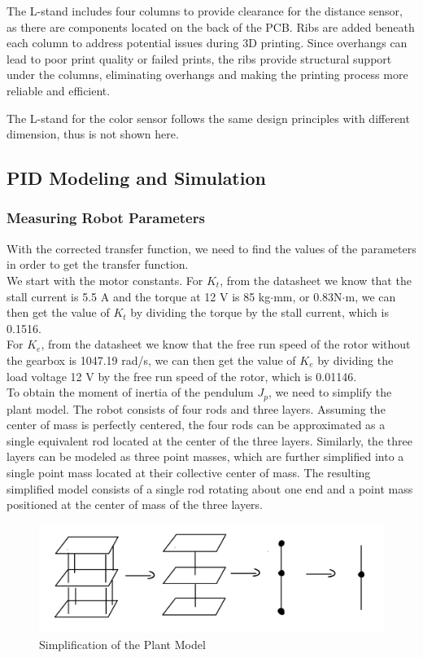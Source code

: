 \documentclass{article}
\begin{document}
The L-stand includes four columns to provide clearance for the distance sensor,
as there are components located on the back of the PCB. Ribs are added beneath
each column to address potential issues during 3D printing. Since overhangs can
lead to poor print quality or failed prints, the ribs provide structural support
under the columns, eliminating overhangs and making the printing process more
reliable and efficient.

The L-stand for the color sensor follows the same design principles with
different dimension, thus is not shown here.
\subsection{PID Modeling and Simulation}
\subsubsection{Measuring Robot Parameters}

With the corrected transfer function, we need to find the values of the
parameters in order to get the transfer function. \\

We start with the motor constants. For $K_t$, from the datasheet we know
that the stall current is 5.5 A and the torque at 12 V is 85 kg$\cdot$mm, or
0.83N$\cdot$m, we can then get the value of $K_t$ by dividing the torque by the
stall current, which is 0.1516. \\

For $K_e$, from the datasheet we know that the free run speed of the rotor
without the gearbox is 1047.19 rad/s, we can then get the value of $K_e$ by
dividing the load voltage 12 V by the free run speed of the rotor, which is
0.01146. \\

To obtain the moment of inertia of the pendulum $J_p$, we need to simplify the
plant model. The robot consists of four rods and three layers. Assuming the
center of mass is perfectly centered, the four rods can be approximated as a
single equivalent rod located at the center of the three layers. Similarly, the
three layers can be modeled as three point masses, which are further simplified
into a single point mass located at their collective center of mass. The
resulting simplified model consists of a single rod rotating about one end and a
point mass positioned at the center of mass of the three layers. \\
\begin{figure}[H]
    \centerline{\includegraphics[width=\linewidth]{Figures/plantModelSimplification.png}}
    \caption{Simplification of the Plant Model}
\end{figure}
\end{document}
